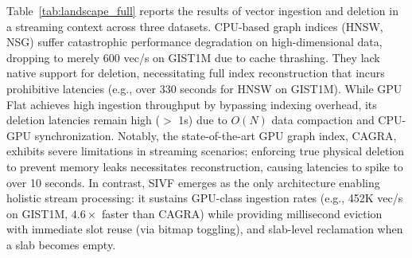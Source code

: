 \documentclass[sigconf,nonacm]{acmart}
\theoremstyle{plain}
\theoremstyle{definition}
\theoremstyle{remark}
\begin{document}
\begin{table}[t]
\caption{Add throughput (K vec/s) and delete latency (ms).}
\label{tab:landscape_full}
\centering
{}
\end{table}

Table~\ref{tab:landscape_full} reports the results of vector ingestion and deletion in a streaming context across three datasets.
CPU-based graph indices (HNSW, NSG) suffer catastrophic performance degradation on high-dimensional data, dropping to merely 600 vec/s on GIST1M due to cache thrashing. They lack native support for deletion, necessitating full index reconstruction that incurs prohibitive latencies (e.g., over 330 seconds for HNSW on GIST1M).
While GPU Flat achieves high ingestion throughput by bypassing indexing overhead, its deletion latencies remain high ($>$ 1s) due to $O(N)$ data compaction and CPU-GPU synchronization.
Notably, the state-of-the-art GPU graph index, CAGRA, exhibits severe limitations in streaming scenarios; enforcing true physical deletion to prevent memory leaks necessitates reconstruction, causing latencies to spike to over 10 seconds.
In contrast, SIVF emerges as the only architecture enabling holistic stream processing: it sustains GPU-class ingestion rates (e.g., 452K vec/s on GIST1M, $4.6\times$ faster than CAGRA) while providing millisecond eviction with immediate slot reuse (via bitmap toggling), and slab-level reclamation when a slab becomes empty. 
\end{document}
